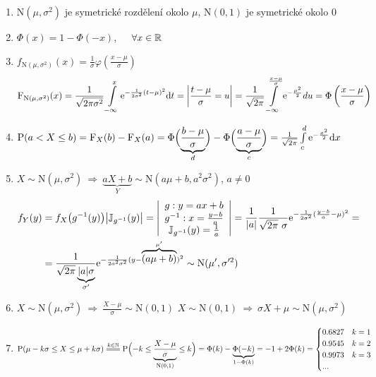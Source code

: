 \begin{theorem}\label{N}
	\begin{enumerate}
		\item $\mathrm{N}(\mu,\sigma^2)$ je symetrické rozdělení okolo $\mu$, $\mathrm{N}(0,1)$ je symetrické okolo 0
		\item $\Phi(x)=1-\Phi(-x)$,~~~$\forall x \in\mathbb{R}$
		\item $f_{\mathrm{N}(\mu,\sigma^2)}(x)=\frac{1}{\sigma}\varphi\left(\frac{x-\mu}{\sigma}\right) $ $$\mathrm{F}_{\mathrm{N}(\mu,\sigma^2)}(x)=\frac{1}{\sqrt{2\pi\sigma^2}}\int\limits_{-\infty}^x \mathrm{e}^{-\frac{1}{2 \sigma^2}(t-\mu)^2}\mathrm{d} t=\left| \frac{t-\mu}{\sigma}=u \right|=\frac{1}{\sqrt{2\pi}}\int\limits_{-\infty}^{\frac{x-\mu}{\sigma}}\mathrm{e}^{-\frac{\mu^2}{2}}du=\Phi\left(\frac{x-\mu}{\sigma}\right)$$ 
		\item $\mathrm{P}(a<X\leq b)=\mathrm{F}_X(b)-\mathrm{F}_X(a)=\Phi\Bigl(\underbrace{\frac{b-\mu}{\sigma}}_{d}\Bigr)-\Phi\Bigl(\underbrace{\frac{a-\mu}{\sigma}}_{c}\Bigr)=\frac{1}{\sqrt{2\pi}}\int\limits_{c}^d \mathrm{e}^{-\frac{x^2}{2}}\mathrm{d} x$
		\item $X\sim \mathrm{N}(\mu,\sigma^2)~\Rightarrow~ \underbrace{aX+b}_{Y} \sim \mathrm{N}(a\mu+b,a^2\sigma^2)$, $a\neq 0$
		\[
		\begin{split}
		f_Y(y)&=f_X\bigl(g^{-1}(y)\bigr)\bigl|\mathbb{J}_{g^{-1}}(y)\bigr|=\left| \begin{array}{c}
		g: y=ax+b	\\ 
		g^{-1}:x=\frac{y-b}{a}	\\ 
		\mathbb{J}_{g^{-1}}(y)=\frac{1}{a}
		\end{array}  \right|=\frac{1}{|a|}\frac{1}{\sqrt{2\pi}~\sigma}\mathrm{e}^{-\frac{1}{2\sigma^2}(\frac{y-b}{a}-\mu)^2}=\\
		&=\frac{1}{\sqrt{2\pi}\underbrace{|a|\sigma}_{\sigma'}}\mathrm{e}^{-\frac{1}{2a^2\sigma^2}(y-\overbrace{(a\mu+b)}^{\mu'})^2}\sim \mathrm{N}(\mu',\sigma'^2) 
		\end{split}
		\] 
		\item $X\sim \mathrm{N}(\mu,\sigma^2)~\Rightarrow~ \frac{X-\mu}{\sigma}\sim \mathrm{N}(0,1)$ \newline
		$X\sim \mathrm{N}(0,1)~\Rightarrow~ \sigma X+\mu \sim \mathrm{N}(\mu,\sigma^2)$
		\item $$ \PP(\mu-k \sigma\leq X \leq \mu+k \sigma)\equal{k\in\N}\PP\Bigl(-k\leq \underbrace{\frac{X-\mu}{\sigma}}_{\mathrm{N}(0,1)}\leq k\Bigr)=\Phi(k)-\underbrace{\Phi(-k)}_{1-\Phi(k)}=-1+2\Phi(k)=\begin{cases}
		0.6827 & k=1 \\ 0.9545 & k=2 \\ 0.9973 & k=3 \\ ... 
		\end{cases} $$
	\end{enumerate}
\end{theorem}
